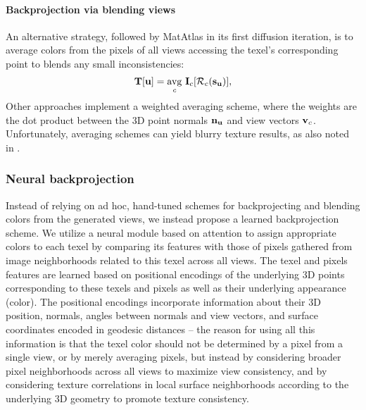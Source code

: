 \paragraph{Backprojection via blending views}
An alternative strategy, followed by MatAtlas \cite{Ceylan:2024:Matatlas} in its first diffusion iteration, 
is to average colors from the pixels of all views accessing the texel's corresponding point to blends any small inconsistencies:
\begin{equation}
 \mathbf{T}[\mathbf{u}] = \operatorname*{avg}_c \, \mathbf{I}_{c}[ \mathcal{R}_{c}( \mathbf{s}_{\mathbf{u}} ) ] , 
 \label{eq:backprojection_matatlas}
\end{equation}
Other approaches \cite{zhang2024texpainter, Cheng:2024:MVPaint} implement a weighted averaging scheme, where the weights are the dot product between the 3D point normals $\mathbf{n}_{\mathbf{u}}$ and view vectors $\mathbf{v}_c$.
Unfortunately, averaging schemes can yield blurry texture results, as also noted in \cite{Ceylan:2024:Matatlas}.

\subsubsection{Neural backprojection} 

Instead of relying on ad hoc, hand-tuned schemes for backprojecting and blending colors from
the generated views, we instead propose a learned backprojection scheme. We utilize a neural 
module based on attention \cite{Vaswani:2017:Attenion} to assign appropriate colors to each 
texel by comparing its features with those of pixels gathered from image neighborhoods 
related to this texel across all views. The texel and pixels features are learned based on   positional encodings of the underlying 3D points corresponding to these texels and pixels
 as well as their underlying appearance (color). The positional encodings incorporate information about their 3D position, normals, angles between normals and view vectors, and surface coordinates encoded in geodesic distances -- the reason for using all this information is that the texel color should not be determined by a pixel from a single view, or by merely averaging pixels, but instead by considering
 broader pixel neighborhoods across all views to maximize view consistency,
 and by   
 considering texture correlations in local surface neighborhoods according to the underlying 3D geometry
 to promote texture consistency.

